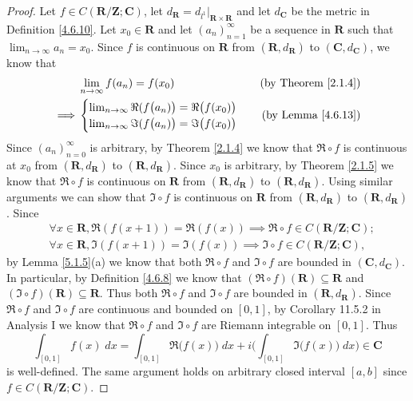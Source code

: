 \begin{proof}
    Let \(f \in C(\mathbf{R} / \mathbf{Z} ; \mathbf{C})\), let \(d_{\mathbf{R}} = d_{l^1}|_{\mathbf{R} \times \mathbf{R}}\) and let \(d_{\mathbf{C}}\) be the metric in Definition \ref{4.6.10}.
    Let \(x_0 \in \mathbf{R}\) and let \((a_n)_{n = 1}^\infty\) be a sequence in \(\mathbf{R}\) such that \(\lim_{n \to \infty} a_n = x_0\).
    Since \(f\) is continuous on \(\mathbf{R}\) from \((\mathbf{R}, d_{\mathbf{R}})\) to \((\mathbf{C}, d_{\mathbf{C}})\), we know that
    \begin{align*}
                 & \lim_{n \to \infty} f(a_n) = f(x_0)                                           & \text{(by Theorem \ref{2.1.4})} \\
        \implies & \begin{cases}
                       \lim_{n \to \infty} \Re(f\big(a_n)\big) = \Re\big(f(x_0)\big) \\
                       \lim_{n \to \infty} \Im(f\big(a_n)\big) = \Im\big(f(x_0)\big)
                   \end{cases} & \text{(by Lemma \ref{4.6.13})}
    \end{align*}
    Since \((a_n)_{n = 0}^\infty\) is arbitrary, by Theorem \ref{2.1.4} we know that \(\Re \circ f\) is continuous at \(x_0\) from \((\mathbf{R}, d_{\mathbf{R}})\) to \((\mathbf{R}, d_{\mathbf{R}})\).
    Since \(x_0\) is arbitrary, by Theorem \ref{2.1.5} we know that \(\Re \circ f\) is continuous on \(\mathbf{R}\) from \((\mathbf{R}, d_{\mathbf{R}})\) to \((\mathbf{R}, d_{\mathbf{R}})\).
    Using similar arguments we can show that \(\Im \circ f\) is continuous on \(\mathbf{R}\) from \((\mathbf{R}, d_{\mathbf{R}})\) to \((\mathbf{R}, d_{\mathbf{R}})\).
    Since
    \begin{align*}
         & \forall x \in \mathbf{R}, \Re(f(x + 1)) = \Re(f(x)) \implies \Re \circ f \in C(\mathbf{R} / \mathbf{Z} ; \mathbf{C}); \\
         & \forall x \in \mathbf{R}, \Im(f(x + 1)) = \Im(f(x)) \implies \Im \circ f \in C(\mathbf{R} / \mathbf{Z} ; \mathbf{C}),
    \end{align*}
    by Lemma \ref{5.1.5}(a) we know that both \(\Re \circ f\) and \(\Im \circ f\) are bounded in \((\mathbf{C}, d_{\mathbf{C}})\).
    In particular, by Definition \ref{4.6.8} we know that \((\Re \circ f)(\mathbf{R}) \subseteq \mathbf{R}\) and \((\Im \circ f)(\mathbf{R}) \subseteq \mathbf{R}\).
    Thus both \(\Re \circ f\) and \(\Im \circ f\) are bounded in \((\mathbf{R}, d_{\mathbf{R}})\).
    Since \(\Re \circ f\) and \(\Im \circ f\) are continuous and bounded on \([0, 1]\), by Corollary 11.5.2 in Analysis I we know that \(\Re \circ f\) and \(\Im \circ f\) are Riemann integrable on \([0, 1]\).
    Thus
    \[
        \int_{[0, 1]} f(x) \; dx = \int_{[0, 1]} \Re\big(f(x)\big) \; dx + i \bigg(\int_{[0, 1]} \Im\big(f(x)\big) \; dx\bigg) \in \mathbf{C}
    \]
    is well-defined.
    The same argument holds on arbitrary closed interval \([a, b]\) since \(f \in C(\mathbf{R} / \mathbf{Z} ; \mathbf{C})\).
\end{proof}

